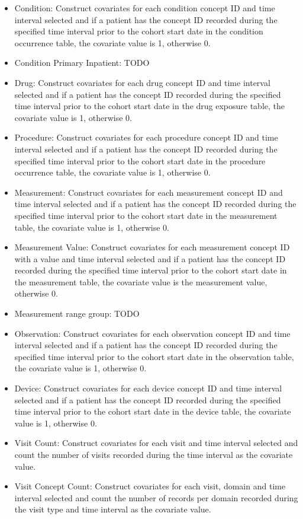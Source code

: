 \documentclass[11pt]{book}
\providecommand{\tightlist}{%
  \setlength{\itemsep}{0pt}\setlength{\parskip}{0pt}}
\theoremstyle{definition}
\theoremstyle{definition}
\theoremstyle{definition}
\theoremstyle{remark}
\begin{document}
\begin{itemize}
\tightlist
\item
  Condition: Construct covariates for each condition concept ID and time interval selected and if a patient has the concept ID recorded during the specified time interval prior to the cohort start date in the condition occurrence table, the covariate value is 1, otherwise 0.
\item
  Condition Primary Inpatient: TODO
\item
  Drug: Construct covariates for each drug concept ID and time interval selected and if a patient has the concept ID recorded during the specified time interval prior to the cohort start date in the drug exposure table, the covariate value is 1, otherwise 0.
\item
  Procedure: Construct covariates for each procedure concept ID and time interval selected and if a patient has the concept ID recorded during the specified time interval prior to the cohort start date in the procedure occurrence table, the covariate value is 1, otherwise 0.
\item
  Measurement: Construct covariates for each measurement concept ID and time interval selected and if a patient has the concept ID recorded during the specified time interval prior to the cohort start date in the measurement table, the covariate value is 1, otherwise 0.
\item
  Measurement Value: Construct covariates for each measurement concept ID with a value and time interval selected and if a patient has the concept ID recorded during the specified time interval prior to the cohort start date in the measurement table, the covariate value is the measurement value, otherwise 0.
\item
  Measurement range group: TODO
\item
  Observation: Construct covariates for each observation concept ID and time interval selected and if a patient has the concept ID recorded during the specified time interval prior to the cohort start date in the observation table, the covariate value is 1, otherwise 0.
\item
  Device: Construct covariates for each device concept ID and time interval selected and if a patient has the concept ID recorded during the specified time interval prior to the cohort start date in the device table, the covariate value is 1, otherwise 0.
\item
  Visit Count: Construct covariates for each visit and time interval selected and count the number of visits recorded during the time interval as the covariate value.
\item
  Visit Concept Count: Construct covariates for each visit, domain and time interval selected and count the number of records per domain recorded during the visit type and time interval as the covariate value.
\end{itemize}
\end{document}
